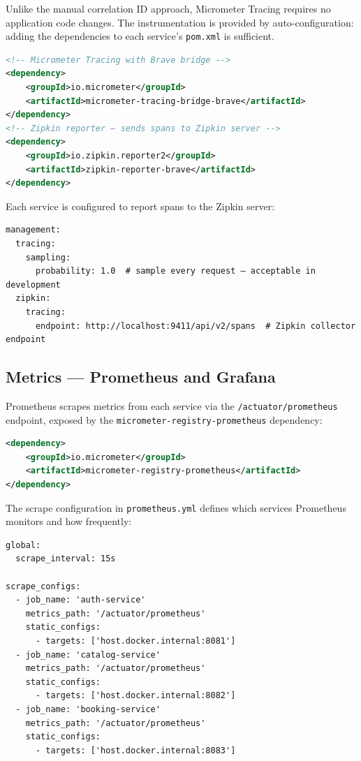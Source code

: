 Unlike the manual correlation ID approach, Micrometer Tracing requires no application code changes. The instrumentation is provided by auto-configuration: adding the dependencies to each service's \texttt{pom.xml} is sufficient.

\begin{lstlisting}[style=javastyle, language=XML, caption={Micrometer Tracing dependencies}]
<!-- Micrometer Tracing with Brave bridge -->
<dependency>
    <groupId>io.micrometer</groupId>
    <artifactId>micrometer-tracing-bridge-brave</artifactId>
</dependency>
<!-- Zipkin reporter — sends spans to Zipkin server -->
<dependency>
    <groupId>io.zipkin.reporter2</groupId>
    <artifactId>zipkin-reporter-brave</artifactId>
</dependency>
\end{lstlisting}

Each service is configured to report spans to the Zipkin server:

\begin{lstlisting}[style=yamlstyle, caption={Zipkin configuration in application.yaml}]
management:
  tracing:
    sampling:
      probability: 1.0  # sample every request — acceptable in development
  zipkin:
    tracing:
      endpoint: http://localhost:9411/api/v2/spans  # Zipkin collector endpoint
\end{lstlisting}

\subsection{Metrics — Prometheus and Grafana}

Prometheus scrapes metrics from each service via the \texttt{/actuator/prometheus} endpoint, exposed by the \texttt{micrometer-registry-prometheus} dependency:

\begin{lstlisting}[style=javastyle, language=XML, caption={Prometheus metrics dependency}]
<dependency>
    <groupId>io.micrometer</groupId>
    <artifactId>micrometer-registry-prometheus</artifactId>
</dependency>
\end{lstlisting}

The scrape configuration in \texttt{prometheus.yml} defines which services Prometheus monitors and how frequently:

\begin{lstlisting}[style=yamlstyle, caption={prometheus.yml scrape configuration}]
global:
  scrape_interval: 15s

scrape_configs:
  - job_name: 'auth-service'
    metrics_path: '/actuator/prometheus'
    static_configs:
      - targets: ['host.docker.internal:8081']
  - job_name: 'catalog-service'
    metrics_path: '/actuator/prometheus'
    static_configs:
      - targets: ['host.docker.internal:8082']
  - job_name: 'booking-service'
    metrics_path: '/actuator/prometheus'
    static_configs:
      - targets: ['host.docker.internal:8083']
\end{lstlisting}

